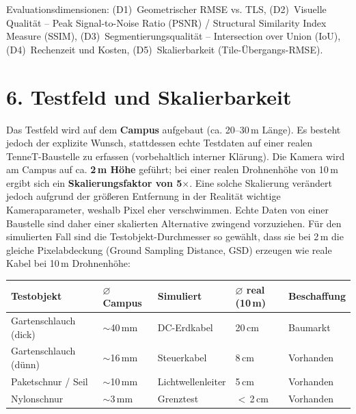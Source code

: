 \documentclass[11pt, a4paper]{article}
\begin{document}
Evaluationsdimensionen: (D1)~Geometrischer RMSE vs. TLS, (D2)~Visuelle Qualit\"at -- Peak Signal-to-Noise Ratio (PSNR) / Structural Similarity Index Measure (SSIM), (D3)~Segmentierungsqualit\"at -- Intersection over Union (IoU), (D4)~Rechenzeit und Kosten, (D5)~Skalierbarkeit (Tile-\"Ubergangs-RMSE).

\section{6. Testfeld und Skalierbarkeit}

Das Testfeld wird auf dem \textbf{Campus} aufgebaut (ca. 20--30\,m L\"ange). Es besteht jedoch der explizite Wunsch, stattdessen echte Testdaten auf einer realen TenneT-Baustelle zu erfassen (vorbehaltlich interner Kl\"arung). Die Kamera wird am Campus auf ca. \textbf{2\,m H\"ohe} gef\"uhrt; bei einer realen Drohnenh\"ohe von 10\,m ergibt sich ein \textbf{Skalierungsfaktor von 5$\times$}. Eine solche Skalierung ver\"andert jedoch aufgrund der gr\"o\ss eren Entfernung in der Realit\"at wichtige Kameraparameter, weshalb Pixel eher verschwimmen. Echte Daten von einer Baustelle sind daher einer skalierten Alternative zwingend vorzuziehen. F\"ur den simulierten Fall sind die Testobjekt-Durchmesser so gew\"ahlt, dass sie bei 2\,m die gleiche Pixelabdeckung (Ground Sampling Distance, GSD) erzeugen wie reale Kabel bei 10\,m Drohnenh\"ohe:

\begin{center}
    \small
    \begin{tabular}{p{3.8cm} p{2.5cm} p{3.5cm} p{2.5cm} p{2cm}}
        \toprule
        \textbf{Testobjekt}     & \textbf{$\varnothing$ Campus} & \textbf{Simuliert} & \textbf{$\varnothing$ real (10\,m)} & \textbf{Beschaffung} \\
        \midrule
        Gartenschlauch (dick)   & $\sim$40\,mm                  & DC-Erdkabel        & 20\,cm                              & Baumarkt             \\
        Gartenschlauch (d\"unn) & $\sim$16\,mm                  & Steuerkabel        & 8\,cm                               & Vorhanden            \\
        Paketschnur / Seil      & $\sim$10\,mm                  & Lichtwellenleiter  & 5\,cm                               & Vorhanden            \\
        Nylonschnur             & $\sim$3\,mm                   & Grenztest          & $<$\,2\,cm                          & Vorhanden            \\
        \bottomrule
    \end{tabular}
\end{center}
\end{document}
